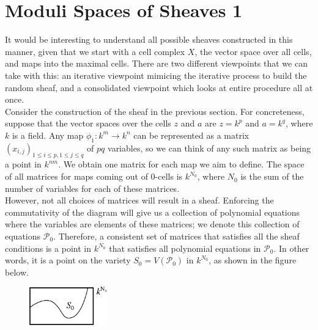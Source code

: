 \documentclass{article}
\newcommand{\cP}{\mathcal{P}}
\theoremstyle{definition}
\begin{document}
\section{Moduli Spaces of Sheaves 1}
It would be interesting to understand all possible sheaves constructed in this manner, given that we start with a cell complex $X$, the vector space over all cells, and maps into the maximal cells. There are two different viewpoints that we can take with this: an iterative viewpoint mimicing the iterative process to build the random sheaf, and a consolidated viewpoint which looks at entire procedure all at once.\\

Consider the construction of the sheaf in the previous section. For concreteness, suppose that the vector spaces over the cells $z$ and $a$ are $z =k^p$ and $a = k^q$, where $k$ is a field. Any map $\phi_1 : k^m \rightarrow k^n$ can be represented as a matrix $(x_{i,j})_{1\leq i \leq p, 1 \leq j \leq q}$ of $pq$ variables, so we can think of any such matrix as being a point in $k^{nm}$. We obtain one matrix for each map we aim to define. The space of all matrices for maps coming out of $0$-cells is $k^{N_0}$, where $N_0$ is the sum of the number of variables for each of these matrices. \\

However, not all choices of matrices will result in a sheaf. Enforcing the commutativity of the diagram will give us a collection of polynomial equations where the variables are elements of these matrices; we denote this collection of equations $\cP_0$. Therefore, a consistent set of matrices that satisfies all the sheaf conditions is a point in $k^{N_0}$ that satisfies all polynomial equations in $\cP_0$. In other words, it is a point on the variety $S_0 = V(\cP_0)$ in $k^{N_0}$, as shown in the figure below.\\

\begin{figure}[!htbp]
\centering
	\includegraphics[width=0.3\textwidth]{images/variety1.eps}
\end{figure}
\end{document}
